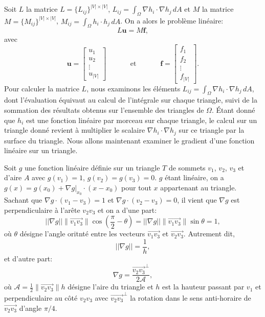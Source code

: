 Soit \(L\) la matrice \(L = \{L_{ij}\}^{|V|\times|V|}\), \(L_{ij} = \displaystyle\int_{\Omega} \nabla h_i \cdot \nabla h_j \,dA\) et \(M\) la matrice \(M = \{M_{ij}\}^{|V|\times|V|}\), \(M_{ij} = \displaystyle\int_{\Omega} h_i \cdot h_j \,dA\). On a alors le problème linéaire:
$$
L\mathbf{u}=M\mathbf{f},
$$
avec
\[
\mathbf{u}=\begin{bmatrix}
u_1\\
u_2\\
\vdots \\
u_{|V|}
\end{bmatrix}
\quad\quad\quad\mbox{ et }\quad\quad\quad
\mathbf{f}=
\begin{bmatrix}
f_1\\
f_2\\
\vdots \\
f_{|V|}
\end{bmatrix}.
\]
Pour calculer la matrice \(L\), nous examinons les éléments \(L_{ij} = \displaystyle\int_{\Omega} \nabla h_i \cdot \nabla h_j \,dA\), dont l'évaluation équivaut au calcul de l'intégrale sur chaque triangle, suivi de la sommation des résultats obtenus sur l'ensemble des triangles de \(\Omega\). Étant donné que \(h_i\) est une fonction linéaire par morceau sur chaque triangle, le calcul sur un triangle donné revient à multiplier le scalaire \(\nabla h_i \cdot \nabla h_j\) sur ce triangle par la surface du triangle. Nous allons maintenant examiner le gradient d'une fonction linéaire sur un triangle.

Soit \(g\) une fonction linéaire définie sur un triangle \(T\) de sommets \(v_1\), \(v_2\), \(v_3\) et d'aire \(A\) avec \(g(v_1) = 1\), \(g(v_2) = g(v_3) = 0\). \(g\) étant linéaire, on a \(g(x) = g(x_0) + \nabla g |_{x_0} \cdot (x - x_0)\) pour tout \(x\) appartenant au triangle.
Sachant que \(\nabla g \cdot (v_1 - v_3) = 1\) et \(\nabla g \cdot (v_2 - v_3) = 0\), il vient que \(\nabla g\) est perpendiculaire à l'arête \(v_2v_3\) et on a d'une part:
\[
||\nabla g|| \|\overrightarrow{v_1v_3}\| \cos\left(\displaystyle\frac{\pi}{2} - \theta\right) = ||\nabla g|| \|\overrightarrow{v_1v_3}\| \sin \theta=1,
\]
où $\theta$ désigne l'angle oritnté entre les vecteurs $\overrightarrow{v_1v_3}$ et $\overrightarrow{v_2v_3}$. Autrement dit,
\begin{equation}
||\nabla g||=\frac{1}{h},
\label{eqn:ca_passe}
\end{equation}
et d'autre part:
\begin{equation}
\nabla g= \displaystyle\frac{\overrightarrow{v_2v_3}^\perp}{2\mathcal{A}},
\label{eqn:ca_casse}
\end{equation}
où $\mathcal{A}=\displaystyle\frac{1}{2} \|\overrightarrow{v_2v_3}\|h$ désigne l'aire du triangle et $h$ est la hauteur passant par $v_1$ et perpendiculaire au côté $v_2v_3$ avec \(\overrightarrow{v_2v_3}^\perp\) la rotation dans le sens anti-horaire de \(\overrightarrow{v_2v_3}\) d'angle \(\pi/4\).

